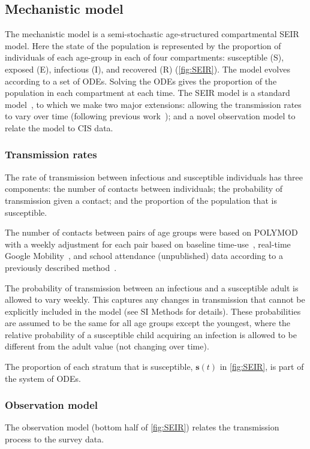 \documentclass[9pt,twocolumn,twoside]{pnas-new}
\renewcommand{\vec}[1]{\bm{#1}}
\begin{document}
{\subsection*{Mechanistic model}
The mechanistic model is a semi-stochastic age-structured compartmental SEIR model.
Here the state of the population is represented by the proportion of individuals of each age-group in each of four compartments: susceptible (S), exposed (E), infectious (I), and recovered (R) (\cref{fig:SEIR}).
The model evolves according to a set of ODEs.
Solving the ODEs gives the proportion of the population in each compartment at each time.
The SEIR model is a standard model~\citep{andersonInfectious,keelingModeling}, to which we make two major extensions: allowing the transmission rates to vary over time (following previous work~\citep{birrellRealtime}); and a novel observation model to relate the model to CIS data.

\subsubsection*{Transmission rates}
The rate of transmission between infectious and susceptible individuals has three components: the number of contacts between individuals; the probability of transmission given a contact; and the proportion of the population that is susceptible.

The number of contacts between pairs of age groups were based on POLYMOD~\citep{mossongSocial} with a weekly adjustment for each pair based on baseline time-use~\citep{UKTUS}, real-time Google Mobility~\citep{googleCOVID19}, and school attendance (unpublished) data according to a previously described method~\citep{vanleeuwenAugmenting,birrellRealtime}.

The probability of transmission between an infectious and a susceptible adult is allowed to vary weekly.
This captures any changes in transmission that cannot be explicitly included in the model (see SI Methods for details).
These probabilities are assumed to be the same for all age groups except the youngest, where the relative probability of a susceptible child acquiring an infection is allowed to be different from the adult value (not changing over time).

The proportion of each stratum that is susceptible, $\vec{s}(t)$ in \cref{fig:SEIR}, is part of the system of ODEs.

\subsubsection*{Observation model}
The observation model (bottom half of \cref{fig:SEIR}) relates the transmission process to the survey data.

}
\end{document}
